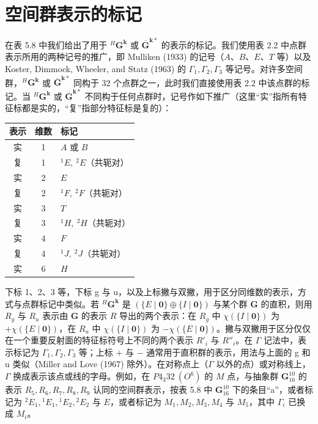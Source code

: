 \section{空间群表示的标记}

在表 5.8 中我们给出了用于 ${}^{H}\mathbf{G}^{\mathbf{k}}$ 或 $\overline{\mathbf{G}}^{\mathbf{k}*}$ 的表示的标记。我们使用表 2.2 中点群表示所用的两种记号的推广，即 Mulliken (1933) 的记号（$A$、$B$、$E$、$T$ 等）以及 Koster, Dimmock, Wheeler, and Statz (1963) 的 $\Gamma_{1}, \Gamma_{2}, \Gamma_{3}$ 等记号。对许多空间群，${}^{H}\mathbf{G}^{\mathbf{k}}$ 或 $\overline{\mathbf{G}}^{\mathbf{k}*}$ 同构于 32 个点群之一，此时我们直接使用表 2.2 中该点群的标记。当 ${}^{H}\mathbf{G}^{\mathbf{k}}$ 或 $\overline{\mathbf{G}}^{\mathbf{k}*}$ 不同构于任何点群时，记号作如下推广（这里“实”指所有特征标都是实的，“复”指部分特征标是复的）：

\begin{center}
\begin{tabular}{ccl}
\toprule
表示 & 维数 & 标记\\
\midrule
实 & 1 & $A$ 或 $B$\\
复 & 1 & ${}^{1}E,\ {}^{2}E$（共轭对）\\
实 & 2 & $E$\\
复 & 2 & ${}^{1}F,\ {}^{2}F$（共轭对）\\
实 & 3 & $T$\\
复 & 3 & ${}^{1}H,\ {}^{2}H$（共轭对）\\
实 & 4 & $F$\\
复 & 4 & ${}^{1}J,\ {}^{2}J$（共轭对）\\
实 & 6 & $H$\\
\bottomrule
\end{tabular}
\end{center}

下标 1、2、3 等，下标 g 与 u，以及上标撇与双撇，用于区分同维数的表示，方式与点群标记中类似。若 ${}^{H}\mathbf{G}^{\mathbf{k}}$ 是 $(\{E \mid \mathbf{0}\} \oplus \{I \mid \mathbf{0}\})$ 与某个群 $\mathbf{G}$ 的直积，则用 $R_{g}$ 与 $R_{u}$ 表示由 $\mathbf{G}$ 的表示 $R$ 导出的两个表示：在 $R_{g}$ 中 $\chi(\{I \mid \mathbf{0}\})$ 为 $+\chi(\{E \mid \mathbf{0}\})$，在 $R_{u}$ 中 $\chi(\{I \mid \mathbf{0}\})$ 为 $-\chi(\{E \mid \mathbf{0}\})$。撇与双撇用于区分仅仅在一个重要反射面的特征标符号上不同的两个表示 $R'_{i}$ 与 $R''_{i}$。在 $\Gamma$ 记法中，表示标记为 $\Gamma_{1}, \Gamma_{2}, \Gamma_{3}$ 等；上标 $+$ 与 $-$ 通常用于直积群的表示，用法与上面的 g 和 u 类似（Miller and Love (1967) 除外）。在对称点上（$\Gamma$ 以外的点）或对称线上，$\Gamma$ 换成表示该点或线的字母。例如，在 $P4_{3}32\ (O^{6})$ 的 $M$ 点，与抽象群 $\mathbf{G}^{10}_{16}$ 的表示 $R_{5}, R_{6}, R_{7}, R_{8}, R_{9}$ 认同的空间群表示，按表 5.8 中 $\mathbf{G}^{10}_{16}$ 下的条目“a”，或者标记为 ${}^{2}E_{1}, {}^{1}E_{1}, {}^{1}E_{2}, {}^{2}E_{2}$ 与 $E$，或者标记为 $M_{1}, M_{2}, M_{3}, M_{4}$ 与 $M_{5}$，其中 $\Gamma_{i}$ 已换成 $M_{i}$。

